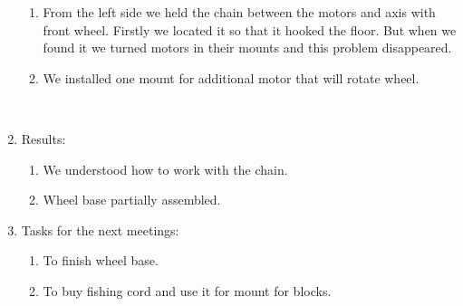 \begin{enumerate}
\begin{enumerate}
		\item From the left side we held the chain between the motors and axis with front wheel. Firstly we located it so that it hooked the floor. But when we found it we turned motors in their mounts and this problem disappeared.
		
		\item We installed one mount for additional motor that will rotate wheel.
		\begin{figure}[H]
			\begin{minipage}[h]{0.2\linewidth}
				\center  
			\end{minipage}
			\begin{minipage}[h]{0.6\linewidth}
				\caption{}
			\end{minipage}
		\end{figure}
		
	\end{enumerate}
	
	\item Results:
	\begin{enumerate}
		
		\item We understood how to work with the chain.
		
		\item Wheel base partially assembled.
		
	\end{enumerate}
	
	\item Tasks for the next meetings:
	\begin{enumerate}
		
		\item To finish wheel base.
		
		\item To buy fishing cord and use it for mount for blocks.
		
	\end{enumerate}
\end{enumerate}
\fillpage
